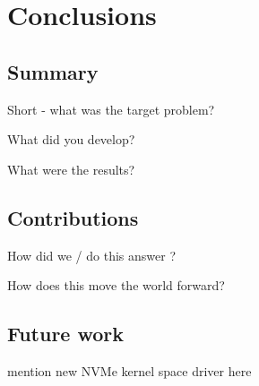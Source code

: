 \chapter{Conclusions}\label{chapter:conclusion}
\section{Summary}

Short - what was the target problem?


What did you develop?

What were the results?


\section{Contributions}\label{sec:concl}



How did we / do this answer ?

How does this move the world forward?

\section{Future work}\label{sec:fw}
mention new NVMe kernel space driver here

